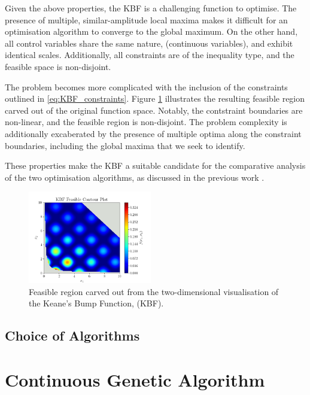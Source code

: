\documentclass[10pt]{article}
\begin{document}
\begin{multicols}{2}
Given the above properties, the KBF is a challenging function to optimise. The presence of multiple, similar-amplitude local maxima makes it difficult for an optimisation algorithm to converge to the global maximum. On the other hand, all control variables share the same nature, (continuous variables), and exhibit identical scales. Additionally, all constraints are of the inequality type, and the feasible space is non-disjoint.

The problem becomes more complicated with the inclusion of the constraints outlined in \ref{eq:KBF_constraints}. Figure \ref{fig:KBF_Feasible} illustrates the resulting feasible region carved out of the original function space. Notably, the contstraint boundaries are non-linear, and the feasible region is non-disjoint. The problem complexity is additionally excaberated by the presence of multiple optima along the constraint boundaries, including the global maxima that we seek to identify.

These properties make the KBF a suitable candidate for the comparative analysis of the two optimisation algorithms, as discussed in the previous work \cite{ELBELTAGY1999639}.

\begin{figure}[H]
    \centering
    \includegraphics[width=0.48\textwidth]{../figures/KBF/KBF Feasible_contour.png}
    \captionsetup{justification=centering}
    \caption{Feasible region carved out from the two-dimensional visualisation of the Keane's Bump Function, (KBF).}
    \label{fig:KBF_Feasible}
\end{figure}

\subsection{Choice of Algorithms}

\section{Continuous Genetic Algorithm}


\end{multicols}
\end{document}
